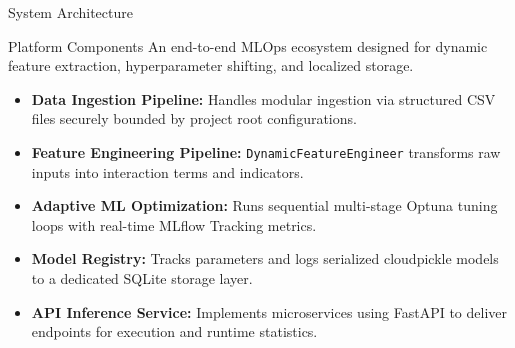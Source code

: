 
\begin{frame}{System Architecture}
    \begin{block}{Platform Components}
        An end-to-end MLOps ecosystem designed for dynamic feature extraction, hyperparameter shifting, and localized storage.
    \end{block}
    \begin{itemize}\scriptsize
        \item \textbf{Data Ingestion Pipeline:} Handles modular ingestion via structured CSV files securely bounded by project root configurations.
        \item \textbf{Feature Engineering Pipeline:} \texttt{DynamicFeatureEngineer} transforms raw inputs into interaction terms and indicators.
        \item \textbf{Adaptive ML Optimization:} Runs sequential multi-stage Optuna tuning loops with real-time MLflow Tracking metrics.
        \item \textbf{Model Registry:} Tracks parameters and logs serialized cloudpickle models to a dedicated SQLite storage layer.
        \item \textbf{API Inference Service:} Implements microservices using FastAPI to deliver endpoints for execution and runtime statistics.
    \end{itemize}
\end{frame}

